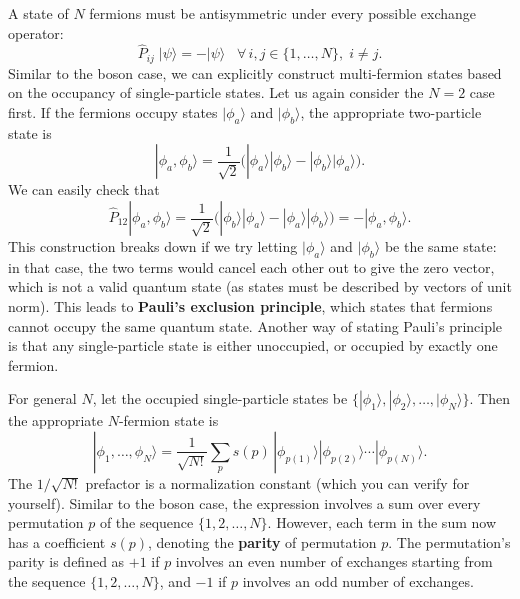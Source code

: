 \documentclass[pra,12pt]{revtex4}
\begin{document}
A state of $N$ fermions must be antisymmetric under every possible
exchange operator:
$$\hat{P}_{ij}\; |\psi\rangle = -|\psi\rangle \;\;\; \forall\, i,j\in\{1,\dots,N\}, \; i\ne j.$$
Similar to the boson case, we can explicitly construct multi-fermion
states based on the occupancy of single-particle states.  Let us again
consider the $N=2$ case first.  If the fermions occupy states
$|\phi_a\rangle$ and $|\phi_b\rangle$, the appropriate two-particle
state is
$$|\phi_a,\phi_b\rangle = \frac{1}{\sqrt{2}} \Big(|\phi_a\rangle|\phi_b\rangle - |\phi_b\rangle|\phi_a\rangle\Big).$$
We can easily check that
$$\hat{P}_{12} |\phi_a,\phi_b\rangle = \frac{1}{\sqrt{2}} \Big(|\phi_b\rangle|\phi_a\rangle - |\phi_a\rangle|\phi_b\rangle\Big) = - |\phi_a,\phi_b\rangle.$$
This construction breaks down if we try letting $|\phi_a\rangle$ and
$|\phi_b\rangle$ be the same state: in that case, the two terms would
cancel each other out to give the zero vector, which is not a valid
quantum state (as states must be described by vectors of unit norm).
This leads to \textbf{Pauli's exclusion principle}, which states that
fermions cannot occupy the same quantum state.  Another way of stating
Pauli's principle is that any single-particle state is either
unoccupied, or occupied by exactly one fermion.

For general $N$, let the occupied single-particle states be
$\{|\phi_1\rangle, |\phi_2\rangle,\dots,|\phi_N\rangle\}$.  Then the
appropriate $N$-fermion state is
$$|\phi_1,\dots,\phi_N\rangle = \frac{1}{\sqrt{N!}} \sum_p s(p)\, |\phi_{p(1)}\rangle |\phi_{p(2)}\rangle \cdots |\phi_{p(N)}\rangle.$$
The $1/\sqrt{N!}$ prefactor is a normalization constant (which you can
verify for yourself).  Similar to the boson case, the expression
involves a sum over every permutation $p$ of the sequence
$\{1,2,\dots,N\}$.  However, each term in the sum now has a
coefficient $s(p)$, denoting the \textbf{parity} of permutation $p$.
The permutation's parity is defined as $+1$ if $p$ involves an even
number of exchanges starting from the sequence $\{1,2,\dots,N\}$, and
$-1$ if $p$ involves an odd number of exchanges.
\end{document}
